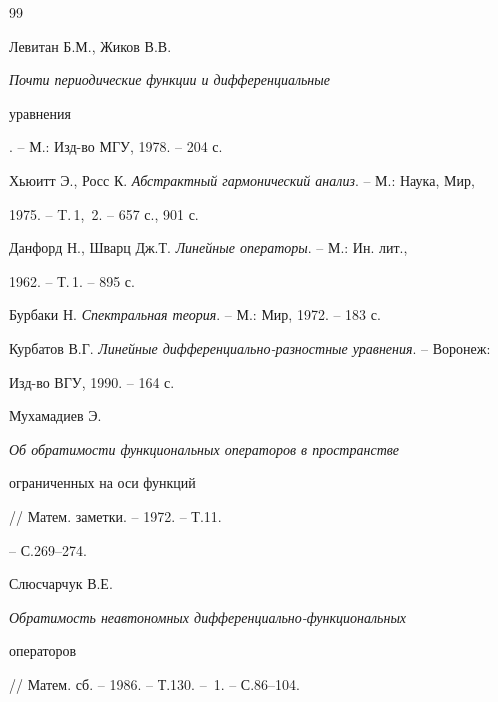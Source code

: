 \begin{thebibliography}{99} 


 




Левитан Б.М., Жиков В.В. {\em Почти периодические функции и дифференциальные 


уравнения}. -- М.: Изд-во МГУ, 1978. -- 204 с. 


 




Хьюитт Э., Росс К. {\em Абстрактный гармонический анализ}. -- М.: Наука, Мир, 


1975. -- T.\,1,~2. -- 657 с., 901 с. 


 




Данфорд Н., Шварц Дж.Т. {\em Линейные операторы}. -- М.: Ин. лит.,


1962. -- Т.\,1. -- 895 с. 


 




Бурбаки Н. {\em Спектральная теория}. -- М.: Мир, 1972. -- 183 с. 


 




Курбатов В.Г. {\em Линейные дифференциально-разностные уравнения}. -- Воронеж: 


Изд-во ВГУ, 1990. -- 164 с. 


 




Мухамадиев Э. {\em Об обратимости функциональных операторов в пространстве 


ограниченных на оси функций} // Матем. заметки. -- 1972. -- Т.11. 


-- С.269--274. 


 




Слюсчарчук В.Е. {\em Обратимость неавтономных дифференциально-функциональных 


операторов} // Матем. сб. -- 1986. -- Т.130. -- \No\,1. -- С.86--104. 


 





\end{thebibliography}
